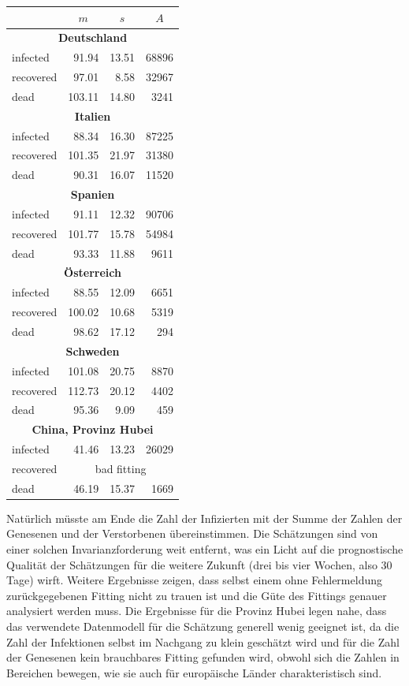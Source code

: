 \documentclass[a4paper,11pt]{article}
\begin{document}
\begin{center}
  \begin{tabular}{|l|r|r|r|}\hline
    & \multicolumn{1}{|c|}{$m$} & \multicolumn{1}{|c|}{$s$}
    & \multicolumn{1}{|c|}{$A$} \\\hline
    \multicolumn{4}{|c|}{\bf Deutschland}\\\hline
    infected   & 91.94 & 13.51 &  68896\\
    recovered  & 97.01 &  8.58 &  32967\\
    dead       &103.11 & 14.80 &   3241\\\hline
    \multicolumn{4}{|c|}{\bf Italien}\\\hline
    infected   & 88.34 & 16.30 &  87225\\
    recovered  &101.35 & 21.97 &  31380\\
    dead       & 90.31 & 16.07 &  11520\\\hline
    \multicolumn{4}{|c|}{\bf Spanien}\\\hline
    infected   & 91.11 & 12.32 &  90706\\
    recovered  &101.77 & 15.78 &  54984\\
    dead       & 93.33 & 11.88 &   9611\\\hline
    \multicolumn{4}{|c|}{\bf Österreich}\\\hline
    infected   & 88.55 & 12.09 &   6651\\
    recovered  &100.02 & 10.68 &   5319\\
    dead       & 98.62 & 17.12 &    294\\\hline
    \multicolumn{4}{|c|}{\bf Schweden}\\\hline
    infected   &101.08 & 20.75 &   8870\\
    recovered  &112.73 & 20.12 &   4402\\
    dead       & 95.36 &  9.09 &    459\\\hline
    \multicolumn{4}{|c|}{\bf China, Provinz Hubei}\\\hline
    infected   & 41.46 & 13.23 &  26029\\
    recovered  & \multicolumn{3}{|c|}{bad fitting}\\
    dead       & 46.19 & 15.37 &   1669\\\hline
  \end{tabular}
\end{center}
Natürlich müsste am Ende die Zahl der Infizierten mit der Summe der Zahlen der
Genesenen und der Verstorbenen übereinstimmen.  Die Schätzungen sind von einer
solchen Invarianzforderung weit entfernt, was ein Licht auf die prognostische
Qualität der Schätzungen für die weitere Zukunft (drei bis vier Wochen, also
30 Tage) wirft.  Weitere Ergebnisse zeigen, dass selbst einem ohne
Fehlermeldung zurückgegebenen Fitting nicht zu trauen ist und die Güte des
Fittings genauer analysiert werden muss.  Die Ergebnisse für die Provinz Hubei
legen nahe, dass das verwendete Datenmodell für die Schätzung generell wenig
geeignet ist, da die Zahl der Infektionen selbst im Nachgang zu klein
geschätzt wird und für die Zahl der Genesenen kein brauchbares Fitting
gefunden wird, obwohl sich die Zahlen in Bereichen bewegen, wie sie auch für
europäische Länder charakteristisch sind.
\end{document}

